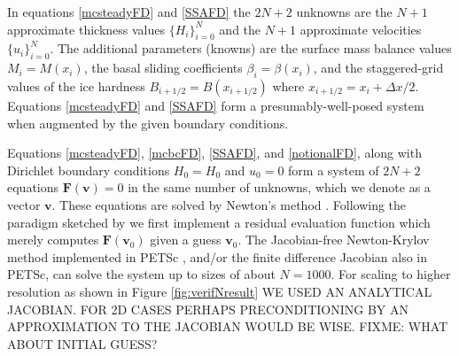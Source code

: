 \documentclass[twocolumn,letterpaper]{igs}
\begin{document}
In equations \eqref{mcsteadyFD} and \eqref{SSAFD} the $2N+2$ unknowns are the $N+1$ approximate thickness values $\{H_i\}_{i=0}^N$ and the $N+1$ approximate velocities $\{u_i\}_{i=0}^N$.  The additional parameters (knowns) are the surface mass balance values $M_i = M(x_i)$, the basal sliding coefficients $\beta_i = \beta(x_i)$, and the staggered-grid values of the ice hardness $B_{i+1/2} =B(x_{i+1/2})$ where $x_{i+1/2} = x_i + \Delta x/2$.  Equations \eqref{mcsteadyFD} and \eqref{SSAFD} form a presumably-well-posed system when augmented by the given boundary conditions.

Equations \eqref{mcsteadyFD}, \eqref{mcbcFD}, \eqref{SSAFD}, and \eqref{notionalFD}, along with Dirichlet boundary conditions $H_0=H_0$ and $u_0=0$ form a system of $2N+2$ equations $\mathbf{F}(\mathbf{v})=0$ in the same number of unknowns, which we denote as a vector $\mathbf{v}$.  These equations are solved by Newton's method \citep[e.g.][]{Pressetal}.  Following the paradigm sketched by \cite{KnollKeyes2004} we first implement a residual evaluation function which merely computes $\mathbf{F}(\mathbf{v}_0)$ given a guess $\mathbf{v}_0$.  The Jacobian-free Newton-Krylov method implemented in PETSc \citep{KnollKeyes2004,petsc-user-ref}, and/or the finite difference Jacobian also in PETSc, can solve the system up to sizes of about $N=1000$.  For scaling to higher resolution as shown in Figure \ref{fig:verifNresult} WE USED AN ANALYTICAL JACOBIAN.  FOR 2D CASES PERHAPS PRECONDITIONING BY AN APPROXIMATION TO THE JACOBIAN WOULD BE WISE.  FIXME: WHAT ABOUT INITIAL GUESS?
\end{document}
